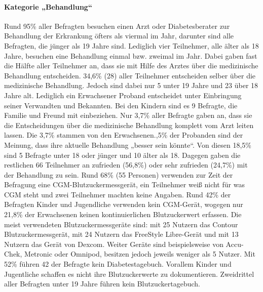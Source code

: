 \documentclass[a4paper,11pt]{article}%
\renewcommand{\\}{\vspace*{0.5\baselineskip} \newline}
\begin{document}
\paragraph{Kategorie „Behandlung“}\mbox{}\\
	Rund 95\% aller Befragten besuchen einen Arzt oder Diabetesberater zur Behandlung der Erkrankung öfters als viermal im Jahr, darunter sind alle Befragten, die jünger als 19 Jahre sind. Lediglich vier Teilnehmer, alle älter als 18 Jahre, besuchen eine Behandlung einmal bzw. zweimal im Jahr. \newline
	Dabei gaben fast die Hälfte aller Teilnehmer an, dass sie mit Hilfe des Arztes über die medizinische Behandlung entscheiden. 34,6\% (28) aller Teilnehmer entscheiden selber über die medizinische Behandlung. Jedoch sind dabei nur 5 unter 19 Jahre und 23 über 18 Jahre alt. Lediglich ein Erwachsener Proband entscheidet unter Einbringung seiner Verwandten und Bekannten. Bei den Kindern sind es 9 Befragte, die Familie und Freund mit einbeziehen.\newline
	Nur 3,7\% aller Befragte gaben an, dass sie die Entscheidungen über die medizinische Behandlung komplett vom Arzt leiten lassen. Die 3,7\% stammen von den Erwachsenen.,5\% der Probanden sind der Meinung, dass ihre aktuelle Behandlung „besser sein könnte“. Von diesen 18,5\% sind 5 Befragte unter 18 oder jünger und 10 älter als 18. Dagegen gaben die restlichen 66 Teilnehmer an zufrieden (56,8\%) oder sehr zufrieden (24,7\%) mit der Behandlung zu sein.\newline
	Rund 68\% (55 Personen) verwenden zur Zeit der Befragung eine CGM-Blutzuckermessgerät, ein Teilnehmer weiß nicht für was CGM steht und zwei Teilnehmer machten keine Angaben. Rund 42\% der Befragten Kinder und Jugendliche verwenden kein CGM-Gerät, wogegen nur 21,8\% der Erwachsenen keinen kontinuierlichen Blutzuckerwert erfassen.\newline
	Die meist verwendeten Blutzuckermessgeräte sind: mit 25 Nutzern das Contour Blutzuckermessgerät, mit 24 Nutzern das FreeStyle Libre-Gerät und mit 13 Nutzern das Gerät von Dexcom. Weiter Geräte sind beispielsweise von Accu-Chek, Metronic oder Omnipod, besitzen jedoch jeweils weniger als 5 Nutzer.\newline
	Mit 52\% führen 42 der Befragte kein Diabetestagebuch. Vorallem Kinder und Jugentliche schaffen es nicht ihre Blutzuckerwerte zu dokumentieren. Zweidrittel aller Befragten unter 19 Jahre führen kein Blutzuckertagebuch.\newline
\end{document}

